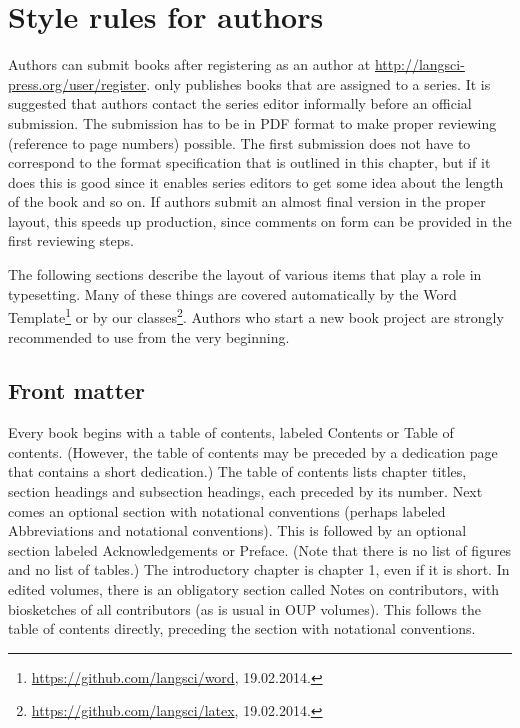 \chapter{Style rules for authors}

Authors can submit books after registering as an author at
\url{http://langsci-press.org/user/register}. \lsp only publishes books that are assigned to a
series. It is suggested that authors contact the series editor informally before an official submission.
The submission has to be in PDF format to make proper
reviewing (reference to page numbers) possible. The first submission does not have to correspond to
the format specification that is outlined in this chapter, but if it does this is good since it
enables series editors to get some idea about the length of the book and so on. If authors submit an
almost final version in the proper layout, this speeds up production, since comments on form can be
provided in the first reviewing steps.



The following sections describe the layout of various items that play a role in typesetting. Many of
these things are covered automatically by the Word Template\footnote{
\url{https://github.com/langsci/word}, 19.02.2014.
} or by our \latex classes\footnote{
\url{https://github.com/langsci/latex}, 19.02.2014.
}. Authors who start a new book project are strongly recommended to use \latex from the very beginning.


\section{Front matter}

Every book begins with a table of contents, labeled Contents or Table of contents. (However, the
table of contents may be preceded by a dedication page that contains a short dedication.) The table
of contents lists chapter titles, section headings and subsection headings, each preceded by its
number.  Next comes an optional section with notational conventions (perhaps labeled Abbreviations
and notational conventions).  This is followed by an optional section labeled Acknowledgements or
Preface.  (Note that there is no list of figures and no list of tables.) The introductory chapter is
chapter 1, even if it is short.  In edited volumes, there is an obligatory section called Notes on
contributors, with biosketches of all contributors (as is usual in OUP volumes). This follows the
table of contents directly, preceding the section with notational conventions.



